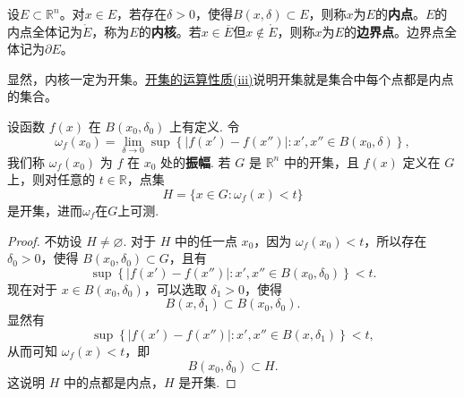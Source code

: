 \documentclass[../../main.tex]{subfiles}
\begin{document}
\begin{definition}[内点与边界点]\label{definition:内点与边界点}
  设\(E\subset\mathbb{R}^n\)。对\(x\in E\)，若存在\(\delta>0\)，使得\(B(x,\delta)\subset E\)，则称\(x\)为\(E\)的\textbf{内点}。\(E\)的内点全体记为\(\mathring{E}\)，称为\(E\)的\textbf{内核}。若\(x\in\overline{E}\)但\(x\notin\mathring{E}\)，则称\(x\)为\(E\)的\textbf{边界点}。边界点全体记为\(\partial E\)。
\end{definition}
\begin{note}
  显然，内核一定为开集。\hyperref[theorem:开集的运算性质]{开集的运算性质(iii)}说明开集就是集合中每个点都是内点的集合。
\end{note}

\begin{proposition}[振幅函数及其性质]\label{proposition:振幅函数可测}
设函数 \( f(x) \) 在 \( B(x_0, \delta_0) \) 上有定义. 令
\[
\omega_f(x_0) = \lim_{\delta \to 0} \sup \left\{ |f(x') - f(x'')| : x', x'' \in B(x_0, \delta) \right\},
\]
我们称 \( \omega_f(x_0) \) 为 \( f \) 在 \( x_0 \) 处的\textbf{振幅}. 若 \( G \) 是 \( \mathbb{R}^n \) 中的开集，且 \( f(x) \) 定义在 \( G \) 上，则对任意的 \( t \in \mathbb{R} \)，点集
\[
H = \{ x \in G : \omega_f(x) < t \}
\]
是开集，进而$\omega_f$在$G$上可测.
\end{proposition}
\begin{proof}
不妨设 \( H \neq \varnothing \). 对于 \( H \) 中的任一点 \( x_0 \)，因为 \( \omega_f(x_0) < t \)，所以存在 \( \delta_0 > 0 \)，使得 \( B(x_0, \delta_0) \subset G \)，且有
\[
\sup \left\{ |f(x') - f(x'')| : x', x'' \in B(x_0, \delta_0) \right\} < t.
\]
现在对于 \( x \in B(x_0, \delta_0) \)，可以选取 \( \delta_1 > 0 \)，使得
\[
B(x, \delta_1) \subset B(x_0, \delta_0).
\]
显然有
\[
\sup \left\{ |f(x') - f(x'')| : x', x'' \in B(x, \delta_1) \right\} < t,
\]
从而可知 \( \omega_f(x) < t \)，即
\[
B(x_0, \delta_0) \subset H.
\]
这说明 \( H \) 中的点都是内点，\( H \) 是开集.
\end{proof}
\end{document}
